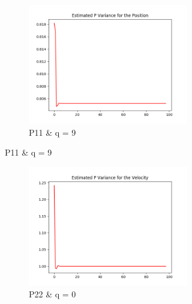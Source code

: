 \documentclass{article}
\begin{document}
\begin{figure}[H]
\begin{subfigure}{1\textwidth}
                \begin{subfigure}{.3\textwidth}  
                    \includegraphics[width=1\linewidth]{./img/p11_qf2.png}
                    \caption[font=0.1mm]{P11 \& q = 9 }
                \end{subfigure}
            \end{subfigure}
            \begin{subfigure} {1\textwidth}    
                \begin{subfigure}{.3\textwidth}  
                    \includegraphics[width=1\linewidth]{./img/p22_qf.png}
                    \caption{P22 \& q = 0 }
                \end{subfigure}
                \begin{subfigure}{.3\textwidth}  

\end{subfigure}
\end{subfigure}
\end{figure}
\end{document}
